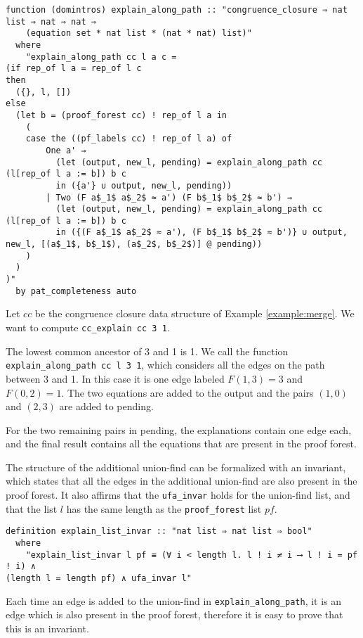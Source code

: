 \begin{lstlisting}
function (domintros) explain_along_path :: "congruence_closure ⇒ nat list ⇒ nat ⇒ nat ⇒
    (equation set * nat list * (nat * nat) list)"
  where
    "explain_along_path cc l a c =
(if rep_of l a = rep_of l c
then
  ({}, l, [])
else
  (let b = (proof_forest cc) ! rep_of l a in
    (
    case the ((pf_labels cc) ! rep_of l a) of
        One a' ⇒
          (let (output, new_l, pending) = explain_along_path cc (l[rep_of l a := b]) b c
          in ({a'} ∪ output, new_l, pending))
        | Two (F a$_1$ a$_2$ ≈ a') (F b$_1$ b$_2$ ≈ b') ⇒
          (let (output, new_l, pending) = explain_along_path cc (l[rep_of l a := b]) b c
          in ({(F a$_1$ a$_2$ ≈ a'), (F b$_1$ b$_2$ ≈ b')} ∪ output, new_l, [(a$_1$, b$_1$), (a$_2$, b$_2$)] @ pending))
    )
  )
)"
  by pat_completeness auto
\end{lstlisting}

\begin{exmp}
Let $cc$ be the congruence closure data structure of Example \ref{example:merge}. We want to compute \lstinline|cc_explain cc 3 1|.

The lowest common ancestor of 3 and 1 is 1. We call the function \lstinline{explain_along_path cc l 3 1}, which considers all the edges on the path between 3 and 1. In this case it is one edge labeled $F (1,3) = 3$ and $F(0,2) = 1$. The two equations are added to the output and the pairs $(1,0)$ and $(2,3)$ are added to pending.

For the two remaining pairs in pending, the explanations contain one edge each, and the final result contains all the equations that are present in the proof forest.
\end{exmp}


The structure of the additional union-find can be formalized with an invariant, which states that all the edges in the additional union-find are also present in the proof forest. It also affirms that the \lstinline{ufa_invar} holds for the union-find list, and that the list $l$ has the same length as the \lstinline{proof_forest} list $pf$.

\begin{lstlisting}
definition explain_list_invar :: "nat list ⇒ nat list ⇒ bool"
  where
    "explain_list_invar l pf ≡ (∀ i < length l. l ! i ≠ i ⟶ l ! i = pf ! i) ∧
(length l = length pf) ∧ ufa_invar l"
\end{lstlisting}

Each time an edge is added to the union-find in \lstinline{explain_along_path}, it is an edge which is also present in the proof forest, therefore it is easy to prove that this is an invariant.

